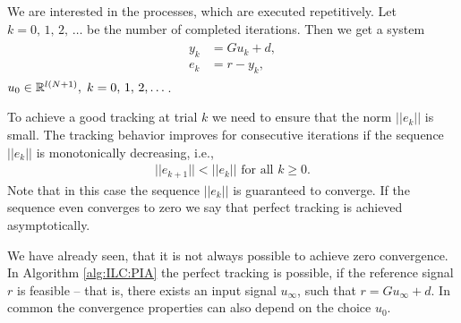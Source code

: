 We are interested in  the processes, which are executed repetitively. Let $k = 0, \, 1, \, 2, \, \dots $ be the number of completed iterations. Then we get a system 
\begin{align}
\label{eq:unitMemory}
\begin{split}
y_{k} &= G u_k + d,  \\ %
e_k &= r - y_k, 
\end{split}
\end{align}
$u_{0} \in {\mathbb{R}}^{l(N+1)},  \; k =0, \,  1, \, 2, \dots $.

To achieve a good tracking at trial $k$ we need to ensure that the norm $||e_k||$ is small. 
The tracking behavior improves for consecutive iterations if the sequence $||e_k||$ is monotonically decreasing, i.e., 
\begin{align}
||e_{k+1} || < ||e_k|| \text{ for all } k \geq 0.
\end{align}
Note that in this case the sequence $||e_k||$ is guaranteed to converge. If the sequence even converges to zero we say that perfect tracking is achieved asymptotically.


We have already seen, that it is not always possible to achieve zero convergence. In Algorithm \ref{alg:ILC:PIA} the perfect tracking is possible, if the reference signal $r$ is feasible -- that is, there exists an input signal $u_\infty$, such that $r = G u_\infty + d$. In common the convergence properties can also depend on the choice $u_0$.



